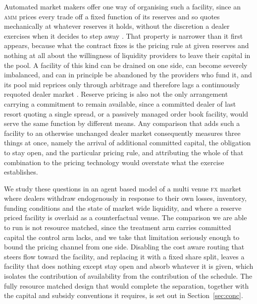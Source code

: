 \documentclass[a4paper,fleqn]{cas-sc}
\newcommand{\acro}[1]{\textsc{\MakeLowercase{#1}}\xspace}
\newcommand{\FX}{\acro{FX}}
\newcommand{\AMM}{\acro{AMM}}
\begin{document}
Automated market makers offer one way of organising such a facility, since an \AMM{} prices every trade off a fixed function of its reserves and so quotes mechanically at whatever reserves it holds, without the discretion a dealer exercises when it decides to step away \citep{mohan}. That property is narrower than it first appears, because what the contract fixes is the pricing rule at given reserves and nothing at all about the willingness of liquidity providers to leave their capital in the pool. A facility of this kind can be drained on one side, can become severely imbalanced, and can in principle be abandoned by the providers who fund it, and its pool mid reprices only through arbitrage and therefore lags a continuously requoted dealer market \citep{park2023,milionis2022}. Reserve pricing is also not the only arrangement carrying a commitment to remain available, since a committed dealer of last resort quoting a single spread, or a passively managed order book facility, would serve the same function by different means. Any comparison that adds such a facility to an otherwise unchanged dealer market consequently measures three things at once, namely the arrival of additional committed capital, the obligation to stay open, and the particular pricing rule, and attributing the whole of that combination to the pricing technology would overstate what the exercise establishes.

We study these questions in an agent based model of a multi venue \FX{} market where dealers withdraw endogenously in response to their own losses, inventory, funding conditions and the state of market wide liquidity, and where a reserve priced facility is overlaid as a counterfactual venue. The comparison we are able to run is not resource matched, since the treatment arm carries committed capital the control arm lacks, and we take that limitation seriously enough to bound the pricing channel from one side. Disabling the cost aware routing that steers flow toward the facility, and replacing it with a fixed share split, leaves a facility that does nothing except stay open and absorb whatever it is given, which isolates the contribution of availability from the contribution of the schedule. The fully resource matched design that would complete the separation, together with the capital and subsidy conventions it requires, is set out in Section~\ref{sec:conc}.
\end{document}
